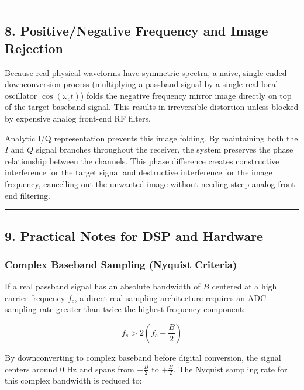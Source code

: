 \documentclass[
]{article}
\begin{document}
\begin{center}\rule{0.5\linewidth}{0.5pt}\end{center}

\subsection{8. Positive/Negative Frequency and Image
Rejection}\label{positivenegative-frequency-and-image-rejection}

Because real physical waveforms have symmetric spectra, a naive,
single-ended downconversion process (multiplying a passband signal by a
single real local oscillator \(\cos(\omega_c t)\)) folds the negative
frequency mirror image directly on top of the target baseband signal.
This results in irreversible distortion unless blocked by expensive
analog front-end RF filters.

Analytic I/Q representation prevents this image folding. By maintaining
both the \(I\) and \(Q\) signal branches throughout the receiver, the
system preserves the phase relationship between the channels. This phase
difference creates constructive interference for the target signal and
destructive interference for the image frequency, cancelling out the
unwanted image without needing steep analog front-end filtering.

\begin{center}\rule{0.5\linewidth}{0.5pt}\end{center}

\subsection{9. Practical Notes for DSP and
Hardware}\label{practical-notes-for-dsp-and-hardware}

\subsubsection{Complex Baseband Sampling (Nyquist
Criteria)}\label{complex-baseband-sampling-nyquist-criteria}

If a real passband signal has an absolute bandwidth of \(B\) centered at
a high carrier frequency \(f_c\), a direct real sampling architecture
requires an ADC sampling rate greater than twice the highest frequency
component:

\[f_s > 2\left(f_c + \frac{B}{2}\right)\]

By downconverting to complex baseband before digital conversion, the
signal centers around \(0\text{ Hz}\) and spans from \(-\frac{B}{2}\) to
\(+\frac{B}{2}\). The Nyquist sampling rate for this complex bandwidth
is reduced to:
\end{document}
